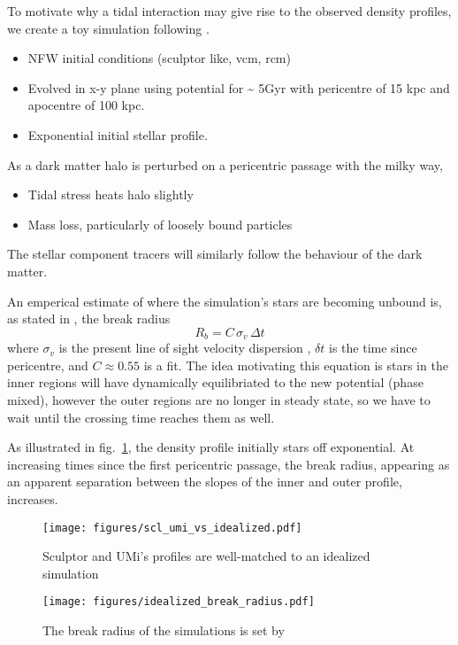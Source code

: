 To motivate why a tidal interaction may give rise to the observed
density profiles, we create a toy simulation following \citet{PNM2008}.

\begin{itemize}
\item
  NFW initial conditions (sculptor like, vcm, rcm)
\item
  Evolved in x-y plane using \citet{EP2020} potential for
  \textasciitilde{} 5Gyr with pericentre of 15 kpc and apocentre of 100
  kpc.
\item
  Exponential initial stellar profile.
\end{itemize}

As a dark matter halo is perturbed on a pericentric passage with the
milky way,

\begin{itemize}
\tightlist
\item
  Tidal stress heats halo slightly
\item
  Mass loss, particularly of loosely bound particles
\end{itemize}

The stellar component tracers will similarly follow the behaviour of the
dark matter.

An emperical estimate of where the simulation's stars are becoming
unbound is, as stated in \citet{PNM2008}, the break radius \[
R_b = C\,\sigma_{v}\,\Delta t
\] where \(\sigma_v\) is the present line of sight velocity dispersion ,
\(\delta t\) is the time since pericentre, and \(C \approx 0.55\) is a
fit. The idea motivating this equation is stars in the inner regions
will have dynamically equilibriated to the new potential (phase mixed),
however the outer regions are no longer in steady state, so we have to
wait until the crossing time reaches them as well.

As illustrated in fig.~\ref{fig:toy_profiles}, the density profile
initially stars off exponential. At increasing times since the first
pericentric passage, the break radius, appearing as an apparent
separation between the slopes of the inner and outer profile, increases.

\begin{figure}
\centering
\texttt{[image: figures/scl\_umi\_vs\_idealized.pdf]}
\caption[Idealized simulations match Scl and UMi]{Sculptor and UMi's
profiles are well-matched to an idealized
simulation}\label{fig:toy_profiles}
\end{figure}

\begin{figure}
\centering
\texttt{[image: figures/idealized\_break\_radius.pdf]}
\caption[Break radius validation]{The break radius of the simulations is
set by}\label{fig:idealized_break_radius}
\end{figure}

